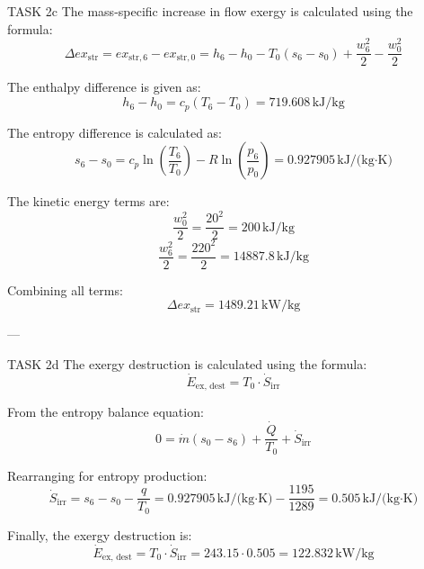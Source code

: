 TASK 2c  
The mass-specific increase in flow exergy is calculated using the formula:  
\[
\Delta ex_{\text{str}} = ex_{\text{str},6} - ex_{\text{str},0} = h_6 - h_0 - T_0 (s_6 - s_0) + \frac{w_6^2}{2} - \frac{w_0^2}{2}
\]  

The enthalpy difference is given as:  
\[
h_6 - h_0 = c_p (T_6 - T_0) = 719.608 \, \text{kJ/kg}
\]  

The entropy difference is calculated as:  
\[
s_6 - s_0 = c_p \ln \left( \frac{T_6}{T_0} \right) - R \ln \left( \frac{p_6}{p_0} \right) = 0.927905 \, \text{kJ/(kg·K)}
\]  

The kinetic energy terms are:  
\[
\frac{w_0^2}{2} = \frac{20^2}{2} = 200 \, \text{kJ/kg}
\]  
\[
\frac{w_6^2}{2} = \frac{220^2}{2} = 14887.8 \, \text{kJ/kg}
\]  

Combining all terms:  
\[
\Delta ex_{\text{str}} = 1489.21 \, \text{kW/kg}
\]  

---

TASK 2d  
The exergy destruction is calculated using the formula:  
\[
\dot{E}_{\text{ex, dest}} = T_0 \cdot \dot{S}_{\text{irr}}
\]  

From the entropy balance equation:  
\[
0 = \dot{m} (s_0 - s_6) + \frac{\dot{Q}}{T_0} + \dot{S}_{\text{irr}}
\]  

Rearranging for entropy production:  
\[
\dot{S}_{\text{irr}} = s_6 - s_0 - \frac{q}{T_0} = 0.927905 \, \text{kJ/(kg·K)} - \frac{1195}{1289} = 0.505 \, \text{kJ/(kg·K)}
\]  

Finally, the exergy destruction is:  
\[
\dot{E}_{\text{ex, dest}} = T_0 \cdot \dot{S}_{\text{irr}} = 243.15 \cdot 0.505 = 122.832 \, \text{kW/kg}
\]  